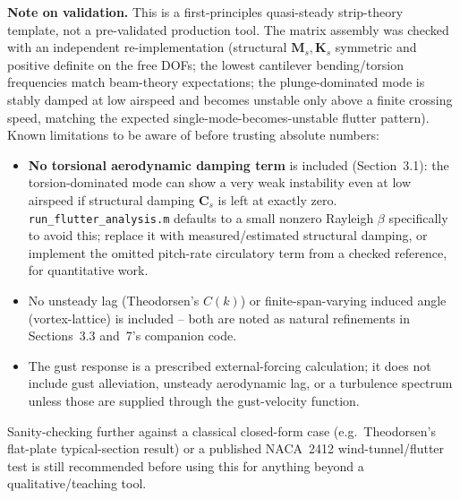 \documentclass[11pt]{article}
\begin{document}
\textbf{Note on validation.} This is a first-principles quasi-steady strip-theory
template, not a pre-validated production tool. The matrix assembly was checked with an
independent re-implementation (structural $\bm M_s,\bm K_s$ symmetric and positive
definite on the free DOFs; the lowest cantilever bending/torsion frequencies match
beam-theory expectations; the plunge-dominated mode is stably damped at low airspeed
and becomes unstable only above a finite crossing speed, matching the expected
single-mode-becomes-unstable flutter pattern). Known limitations to be aware of before
trusting absolute numbers:
\begin{itemize}
\item \textbf{No torsional aerodynamic damping term} is included (Section~3.1):
the torsion-dominated mode can show a very weak instability even at low airspeed if
structural damping $\bm C_s$ is left at exactly zero. \texttt{run\_flutter\_analysis.m}
defaults to a small nonzero Rayleigh $\beta$ specifically to avoid this; replace it with
measured/estimated structural damping, or implement the omitted pitch-rate circulatory
term from a checked reference, for quantitative work.
\item No unsteady lag (Theodorsen's $C(k)$) or finite-span-varying induced angle
(vortex-lattice) is included -- both are noted as natural refinements in
Sections~3.3 and~7's companion code.
\item The gust response is a prescribed external-forcing calculation; it does not include
gust alleviation, unsteady aerodynamic lag, or a turbulence spectrum unless those are
supplied through the gust-velocity function.
\end{itemize}
Sanity-checking further against a classical closed-form case (e.g.\ Theodorsen's
flat-plate typical-section result) or a published NACA~2412 wind-tunnel/flutter test is
still recommended before using this for anything beyond a qualitative/teaching tool.
\end{document}
